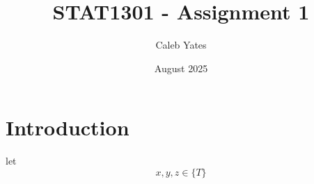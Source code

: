 \documentclass{article}
\title{STAT1301 - Assignment 1}
\author{Caleb Yates }
\date{August 2025}
\begin{document}
\newcommand{\T}{\mathrm{T}}
\newcommand{\F}{\mathrm{F}}

\maketitle

\section{Introduction}

let $$x, y, z \in \{ T \}$$
\end{document}
